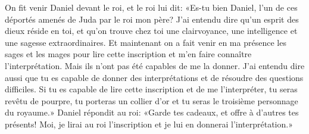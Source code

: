 On fit venir Daniel devant le roi, et le roi lui dit:
	«Es-tu bien Daniel, l’un de ces déportés amenés de Juda par le roi mon père?
J’ai entendu dire qu’un esprit des dieux réside en toi,
	et qu’on trouve chez toi une clairvoyance,
	une intelligence et une sagesse extraordinaires.
Et maintenant on a fait venir en ma présence les sages et les mages
	pour lire cette inscription et m’en faire connaître l’interprétation.
	Mais ils n’ont pas été capables de me la donner.
J’ai entendu dire aussi que tu es capable de donner des interprétations
	et de résoudre des questions difficiles.
Si tu es capable de lire cette inscription et de me l’interpréter,
	tu seras revêtu de pourpre, tu porteras un collier d’or
	et tu seras le troisième personnage du royaume.»
Daniel répondit au roi: «Garde tes cadeaux, et offre à d’autres tes présents!
	Moi, je lirai au roi l’inscription et je lui en donnerai l’interprétation.»
